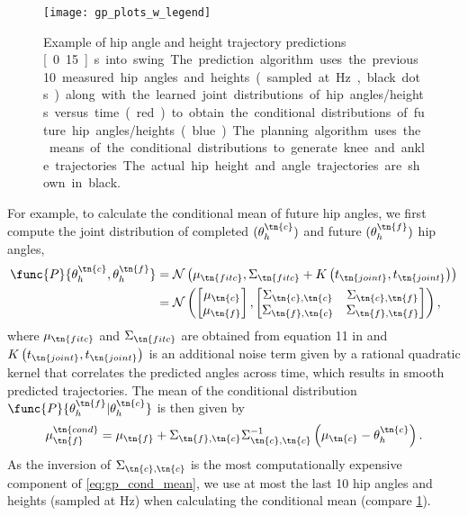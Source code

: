 \begin{figure}[t]
    \centering
    \texttt{[image: gp\_plots\_w\_legend]}
    \caption[Example of hip angle and height trajectory predictions]{Example of
    hip angle and height trajectory predictions \unit[0.15]{s} into swing. The
    prediction algorithm uses the previous 10 measured hip angles and heights
    (sampled at \unit[100]{Hz}, black dots) along with the learned joint
    distributions of hip angles/heights versus time (red) to obtain the
    conditional distributions of future hip angles/heights (blue). The planning
    algorithm uses the means of the conditional distributions to generate knee
    and ankle trajectories. The actual hip height and angle trajectories are
    shown in black.}\label{fig:gp_plots}
\end{figure}
For example, to calculate the conditional mean of future hip angles, we first
compute the joint distribution of completed $(\theta_h^\tn{c})$ and future
$(\theta_h^\tn{f})$ hip angles,
\begin{align}
    \func{P}{\theta_h^\tn{c}, \theta_h^\tn{f}} &=
        \mathcal{N}\left(\mu_\tn{fitc}, \Sigma_\tn{fitc} 
            + K\left( t_\tn{joint}, t_\tn{joint} \right) \right) \\
    &= \mathcal{N}\left( 
        \begin{bmatrix} 
            \mu_\tn{c} \\ \mu_\tn{f} 
        \end{bmatrix},
        \begin{bmatrix} 
            \Sigma_{\tn{c},\tn{c}} & \Sigma_{\tn{c},\tn{f}} \\ 
            \Sigma_{\tn{f},\tn{c}} & \Sigma_{\tn{f},\tn{f}} 
        \end{bmatrix}
        \right),
\end{align}
where $\mu_\tn{fitc}$ and $\Sigma_\tn{fitc}$ are obtained from equation 11 in
\citep{snelson2007local} and $K\left( t_\tn{joint}, t_\tn{joint}\right)$ is an
additional noise term given by a rational quadratic kernel
\citep{rasmussen2004gaussian} that correlates the predicted angles across time,
which results in smooth predicted trajectories. The mean of the conditional
distribution $\func{P}{\theta_h^\tn{f}|\theta_h^\tn{c}}$ is then given by
\begin{align}
    \mu_\tn{f}^\tn{cond} = \mu_\tn{f} + \Sigma_{\tn{f},\tn{c}}
        \Sigma_{\tn{c},\tn{c}}^{-1}\left(\mu_\tn{c} - \theta_h^\tn{c} \right).
    \label{eq:gp_cond_mean}
\end{align}
As the inversion of $\Sigma_{\tn{c},\tn{c}}$ is the most computationally
expensive component of \cref{eq:gp_cond_mean}, we use at most the last 10 hip
angles and heights (sampled at \unit[100]{Hz}) when calculating the conditional
mean (compare \cref{fig:gp_plots}).

